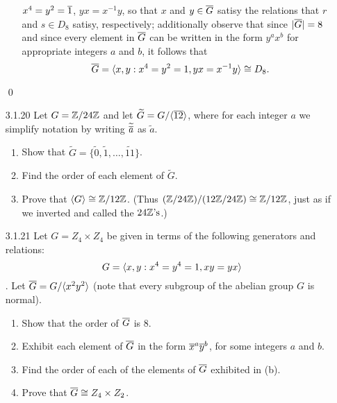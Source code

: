 \begin{enumerate}
\begin{enumerate}
               $x^4 = y^2 = \overline{1}$, $yx = x^{-1}y$, so that $x$ and $y \in\overline{G}$ 
               satisy the relations that $r$ and $s \in D_8$ satisy,
               respectively; additionally observe that since $|\overline{G}| = 8$ and 
               since every element in $\overline{G}$ can be written in the form
               $y^ax^b$ for appropriate integers $a$ and $b$, it follows that
               $$\overline{G} = \langle x, y : x^4 = y^2 = 1, yx = x^{-1}y \rangle \cong D_8.$$
      \end{enumerate} \qed
   \item[3.1.20]  Let $G = \mathbb{Z}/24\mathbb{Z}$ and let
                  $\widetilde{G} = G/\langle \overline{12} \rangle$, where for each integer $a$
                  we simplify notation by writing $\widetilde{\overline{a}}$ as
                  $\widetilde{a}$.
                  \begin{enumerate}
                     \item Show that $\widetilde{G} = \{\widetilde{0},
                           \widetilde{1}, \ldots, \widetilde{11}\}$.
                     \item Find the order of each element of $\widetilde{G}$.
                     \item Prove that $\langle G \rangle \cong \mathbb{Z}/12\mathbb{Z}$. (Thus
                           $(\mathbb{Z}/24\mathbb{Z})/(12\mathbb{Z}/24\mathbb{Z}) \cong \mathbb{Z}/12\mathbb{Z}$, just as if we
                           inverted and called the $24\mathbb{Z}\text{'s}$.)
                  \end{enumerate}
   \item[3.1.21]  Let $G = Z_4 \times Z_4$ be given in terms of the following
                  generators and relations:
                  $$G = \langle x, y : x^4 = y^4 = 1, xy = yx \rangle$$.
                  Let $\overline{G} = G/\langle x^2y^2 \rangle$ (note that every subgroup of the
                  abelian group $G$ is normal).
                  \begin{enumerate}
                     \item Show that the order of $\overline{G}$ is 8.
                     \item Exhibit each element of $\overline{G}$ in the form
                           $\overline{x}^a\overline{y}^b$, for some integers $a$ and $b$.
                     \item Find the order of each of the elements of $\overline{G}$
                           exhibited in (b).
                     \item Prove that $\overline{G} \cong Z_4 \times Z_2$.

\end{enumerate}
\end{enumerate}
